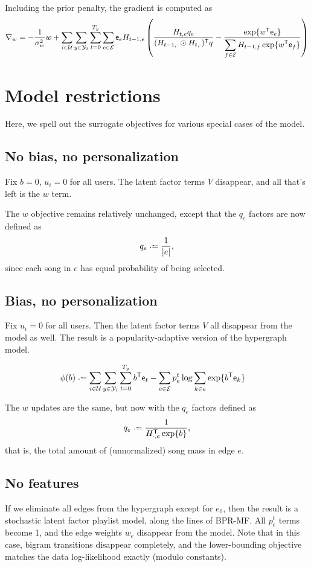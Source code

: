 \documentclass{article}
\def\e{\ensuremath{\mathsf{e}}}
\def\E{\ensuremath{\mathcal{E}}}
\def\U{\ensuremath{\mathcal{U}}}
\begin{document}
Including the prior penalty, the gradient is computed as
\begin{equation}
\nabla_w = -\frac{1}{\sigma_w^2} w + \sum_{i\in\U}\sum_{y\in\Y_i}\sum_{t=0}^{T_y} \sum_{e\in\E} \e_e H_{t-1,e} \left(\frac{H_{t,e} q_e}{(H_{t-1,\cdot} \odot H_{t,\cdot})\trans q} - \frac{\exp\{w\trans
\e_e\}}{\displaystyle\sum_{f \in \E} H_{t-1,f} \exp\{w\trans \e_f\}}\right)
\end{equation}

\section{Model restrictions}

Here, we spell out the surrogate objectives for various special cases of the model.

\subsection{No bias, no personalization}
Fix $b=0$, $u_i=0$ for all users.  The latent factor terms $V$ disappear, and all that's left is the $w$ term.

The $w$ objective remains relatively unchanged, except that the $q_e$ factors are now defined as
\[
q_e \defeq \frac{1}{|e|},
\]
since each song in $e$ has equal probability of being selected.

\subsection{Bias, no personalization}

Fix $u_i = 0$ for all users.  Then the latent factor terms $V$ all disappear from the model as well.
The result is a popularity-adaptive version of the hypergraph model.

\begin{align}
\phi(b) &\defeq \sum_{i\in\U}\sum_{y\in\Y_i}\sum_{t=0}^{T_y} b\trans \e_t - \sum_{e\in\E} p_e^t \log \sum_{k\in e} \exp\{b\trans \e_k\}
\end{align}

The $w$ updates are the same, but now with the $q_e$ factors defined as
\[
q_e \defeq \frac{1}{H_{\cdot, e}\trans \exp\{b\}},
\]
that is, the total amount of (unnormalized) song mass in edge $e$.

\subsection{No features}
If we eliminate all edges from the hypergraph except for $e_0$, then the result is a stochastic latent factor playlist model, along the lines of BPR-MF.
All $p_e^t$ terms become 1, and the edge weights $w_e$ disappear from the model.  Note that in this case, bigram transitions disappear completely, and the lower-bounding objective 
matches the data log-likelihood exactly (modulo constants).
\end{document}
